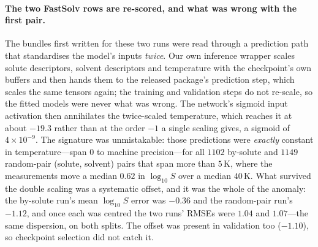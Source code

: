 \paragraph{The two FastSolv rows are re-scored, and what was wrong with the first pair.} The bundles
first written for these two runs were read through a
prediction path that standardises the model's inputs \emph{twice}. Our own inference wrapper scales
solute descriptors, solvent descriptors and temperature with
the checkpoint's own buffers and then hands them to the released package's prediction step, which
scales the same tensors again; the training and
validation steps do not re-scale, so the fitted models were never what was wrong. The network's sigmoid
input activation then annihilates the twice-scaled temperature, which reaches it at about $-19.3$
rather than at the order $-1$ a single scaling gives, a sigmoid of $4\times10^{-9}$. The signature was
unmistakable: those predictions were \emph{exactly} constant in temperature---span $0$ to machine
precision---for all $1102$ by-solute and $1149$ random-pair (solute, solvent) pairs that span more
than $5$\,K, where the measurements move a median $0.62$ in $\log_{10}S$ over a median $40$\,K.
What survived the
double scaling was a systematic offset, and it was the whole of the anomaly: the by-solute run's mean
$\log_{10}S$ error was $-0.36$ and the random-pair run's $-1.12$, and once each was centred the two
runs' RMSEs were $1.04$ and $1.07$---the same dispersion, on both splits. The offset was present in
validation too ($-1.10$), so checkpoint selection did not catch it.

